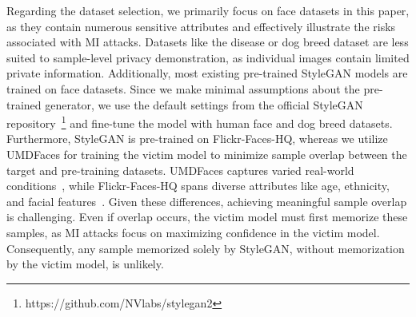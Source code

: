 Regarding the dataset selection, we primarily focus on face datasets in this paper, as they contain numerous sensitive attributes and effectively illustrate the risks associated with MI attacks. Datasets like the disease or dog breed dataset are less suited to sample-level privacy demonstration, as individual images contain limited private information. Additionally, most existing pre-trained StyleGAN models are trained on face datasets. Since we make minimal assumptions about the pre-trained generator, we use the default settings from the official StyleGAN repository~\footnote{https://github.com/NVlabs/stylegan2} and fine-tune the model with human face and dog breed datasets.
Furthermore, StyleGAN is pre-trained on Flickr-Faces-HQ, whereas we utilize UMDFaces for training the victim model to minimize sample overlap between the target and pre-training datasets. UMDFaces captures varied real-world conditions~\cite{umdfaces}, while Flickr-Faces-HQ spans diverse attributes like age, ethnicity, and facial features~\cite{stylegan2ada_20nips}. Given these differences, achieving meaningful sample overlap is challenging. Even if overlap occurs, the victim model must first memorize these samples, as MI attacks focus on maximizing confidence in the victim model. Consequently, any sample memorized solely by StyleGAN, without memorization by the victim model, is unlikely.

